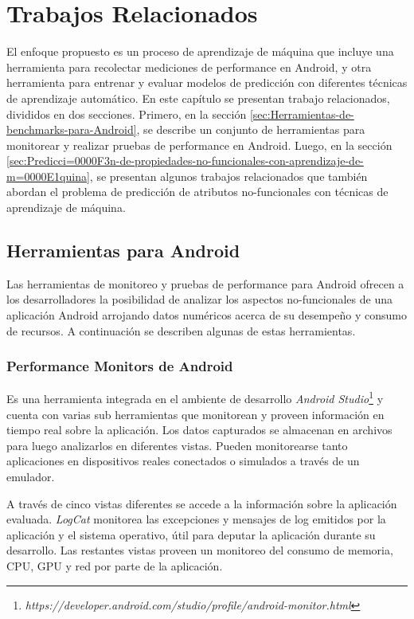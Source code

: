 
\chapter{Trabajos Relacionados\label{chap:Trabajos-Relacionados}}

El enfoque propuesto es un proceso de aprendizaje de máquina que incluye
una herramienta para recolectar mediciones de performance en Android,
y otra herramienta para entrenar y evaluar modelos de predicción con
diferentes técnicas de aprendizaje automático. En este capítulo se
presentan trabajo relacionados, divididos en dos secciones. Primero,
en la sección \ref{sec:Herramientas-de-benchmarks-para-Android},
se describe un conjunto de herramientas para monitorear y realizar
pruebas de performance en Android. Luego, en la sección \ref{sec:Predicci=0000F3n-de-propiedades-no-funcionales-con-aprendizaje-de-m=0000E1quina},
se presentan algunos trabajos relacionados que también abordan el
problema de predicción de atributos no-funcionales con técnicas de
aprendizaje de máquina.


\section{Herramientas para Android\label{sec:Herramientas-de-benchmarks-para-Android}}

Las herramientas de monitoreo y pruebas de performance para Android
ofrecen a los desarrolladores la posibilidad de analizar los aspectos
no-funcionales de una aplicación Android arrojando datos numéricos
acerca de su desempeño y consumo de recursos. A continuación se describen
algunas de estas herramientas. 


\subsection*{Performance Monitors de Android \label{sub:Performance-Monitors-de-Android }}

Es una herramienta integrada en el ambiente de desarrollo \emph{Android
Studio}\footnote{\emph{https://developer.android.com/studio/profile/android-monitor.html}}
y cuenta con varias sub herramientas que monitorean y proveen información
en tiempo real sobre la aplicación. Los datos capturados se almacenan
en archivos para luego analizarlos en diferentes vistas. Pueden monitorearse
tanto aplicaciones en dispositivos reales conectados o simulados a
través de un emulador.

A través de cinco vistas diferentes se accede a la información sobre
la aplicación evaluada. \emph{LogCat} monitorea las excepciones y
mensajes de log emitidos por la aplicación y el sistema operativo,
útil para deputar la aplicación durante su desarrollo. Las restantes
vistas proveen un monitoreo del consumo de memoria, CPU, GPU y red
por parte de la aplicación.


